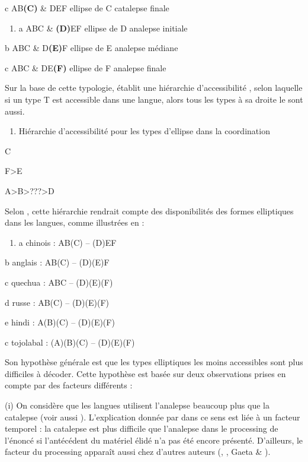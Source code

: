  c  AB\textbf{(C)} \& DEF  ellipse de C    catalepse finale  


\begin{enumerate}
\item \label{bkm:Ref305327155}a  ABC \& \textbf{(D)}EF  ellipse de D    analepse initiale  


\end{enumerate}
  b  ABC \& D\textbf{(E)}F  ellipse de E    analepse médiane

  c  ABC \& DE\textbf{(F)}  ellipse de F    analepse finale  

Sur la base de cette typologie, \citet{Sanders1977} établit une hiérarchie d'accessibilité , selon laquelle si un type T est accessible dans une langue, alors tous les types à sa droite le sont aussi.


\begin{enumerate}
\item \label{bkm:Ref305704096}Hiérarchie d'accessibilité pour les types d'ellipse dans la coordination  


\end{enumerate}

C

F>E

A>B>???>D


Selon \citet{Sanders1977}, cette hiérarchie rendrait compte des disponibilités des formes elliptiques dans les langues, comme illustrées en  :


\begin{enumerate}
\item \label{bkm:Ref305328194}a  chinois :  AB(C) -- (D)EF  


\end{enumerate}
  b  anglais :  AB(C) -- (D)(E)F

  c  quechua :  ABC -- (D)(E)(F)

  d  russe :  AB(C) -- (D)(E)(F)

  e  hindi :  A(B)(C) -- (D)(E)(F)

  c  tojolabal :  (A)(B)(C) -- (D)(E)(F)       

Son hypothèse générale est que les types elliptiques les moins accessibles sont plus difficiles à décoder. Cette hypothèse est basée sur deux observations prises en compte par des facteurs différents : 

(i) On considère que les langues utilisent l'analepse beaucoup plus que la catalepse (voir aussi \citet{Haspelmath2007}). L'explication donnée par \citet{Sanders1977} dans ce sens est liée à un facteur temporel : la catalepse est plus difficile que l'analepse dans le processing de l'énoncé si l'antécédent du matériel élidé n'a pas été encore présenté. D'ailleurs, le facteur du processing apparaît aussi chez d'autres auteurs (\citet{Ramat1987}, \citet{Hawkins1988}, Gaeta \& \citet{Luraghi2001}). 

